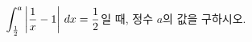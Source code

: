 $\displaystyle\int_{\frac{1}{2}}^{a}\left|\dfrac{1}{x}-1\right|\mkern3mu dx=\dfrac{1}{2}$일 때, 정수 $a$의 값을 구하시오. 
